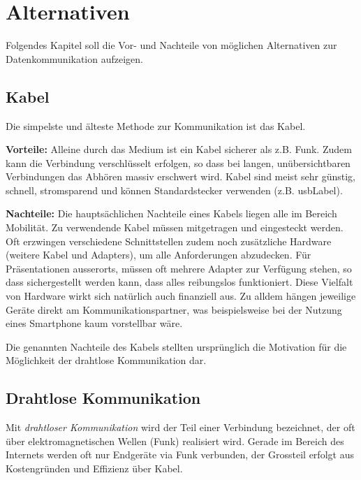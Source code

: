 \chapter{Alternativen}
\label{ch:alt}
Folgendes Kapitel soll die Vor- und Nachteile von möglichen Alternativen zur Datenkommunikation aufzeigen.

\section{Kabel}
Die simpelste und älteste Methode zur Kommunikation ist das Kabel.

\textbf{Vorteile:} Alleine durch das Medium ist ein Kabel sicherer als z.B. Funk. Zudem kann die Verbindung verschlüsselt erfolgen, so dass bei langen, unübersichtbaren Verbindungen das Abhören massiv erschwert wird. Kabel sind meist sehr günstig, schnell, stromsparend und können Standardstecker verwenden (z.B. \gls{usbLabel}).

\textbf{Nachteile:} Die hauptsächlichen Nachteile eines Kabels liegen alle im Bereich Mobilität.
Zu verwendende Kabel müssen mitgetragen und eingesteckt werden.
Oft erzwingen verschiedene Schnittstellen zudem noch zusätzliche Hardware (weitere Kabel und Adapters), um alle Anforderungen abzudecken.
Für Präsentationen ausserorts, müssen oft mehrere Adapter zur Verfügung stehen, so dass sichergestellt werden kann, dass alles reibungslos funktioniert.
Diese Vielfalt von Hardware wirkt sich natürlich auch finanziell aus. Zu alldem hängen jeweilige Geräte direkt am Kommunikationspartner, was beispielsweise bei der Nutzung eines Smartphone kaum vorstellbar wäre.

Die genannten Nachteile des Kabels stellten ursprünglich die Motivation für die Möglichkeit der drahtlose Kommunikation dar.

\section{Drahtlose Kommunikation}

Mit \textit{drahtloser Kommunikation} wird der Teil einer Verbindung bezeichnet, der oft über elektromagnetischen Wellen (Funk) realisiert wird.
Gerade im Bereich des Internets werden oft nur Endgeräte via Funk verbunden, der Grossteil erfolgt aus Kostengründen und Effizienz über Kabel.





